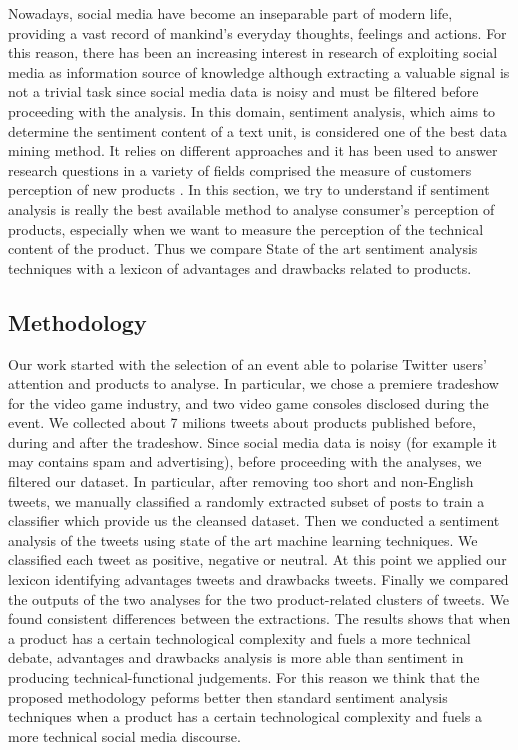 \documentclass[b5paper,]{book}
\theoremstyle{definition}
\theoremstyle{definition}
\theoremstyle{definition}
\theoremstyle{remark}
\begin{document}
Nowadays, social media have become an inseparable part of modern life,
providing a vast record of mankind's everyday thoughts, feelings and
actions. For this reason, there has been an increasing interest in
research of exploiting social media as information source of knowledge
although extracting a valuable signal is not a trivial task since social
media data is noisy and must be filtered before proceeding with the
analysis. In this domain, sentiment analysis, which aims to determine
the sentiment content of a text unit, is considered one of the best data
mining method. It relies on different approaches
\citep{collomb2014study} and it has been used to answer research
questions in a variety of fields comprised the measure of customers
perception of new products \citep{mirtalaie2018extracting}. In this
section, we try to understand if sentiment analysis is really the best
available method to analyse consumer's perception of products,
especially when we want to measure the perception of the technical
content of the product. Thus we compare State of the art sentiment
analysis techniques with a lexicon of advantages and drawbacks related
to products.

\subsection{Methodology}\label{methodology-8}

Our work started with the selection of an event able to polarise Twitter
users' attention and products to analyse. In particular, we chose a
premiere tradeshow for the video game industry, and two video game
consoles disclosed during the event. We collected about 7 milions tweets
about products published before, during and after the tradeshow. Since
social media data is noisy (for example it may contains spam and
advertising), before proceeding with the analyses, we filtered our
dataset. In particular, after removing too short and non-English tweets,
we manually classified a randomly extracted subset of posts to train a
classifier which provide us the cleansed dataset. Then we conducted a
sentiment analysis of the tweets using state of the art machine learning
techniques. We classified each tweet as positive, negative or neutral.
At this point we applied our lexicon identifying advantages tweets and
drawbacks tweets. Finally we compared the outputs of the two analyses
for the two product-related clusters of tweets. We found consistent
differences between the extractions. The results shows that when a
product has a certain technological complexity and fuels a more
technical debate, advantages and drawbacks analysis is more able than
sentiment in producing technical-functional judgements. For this reason
we think that the proposed methodology peforms better then standard
sentiment analysis techniques when a product has a certain technological
complexity and fuels a more technical social media discourse.
\end{document}
